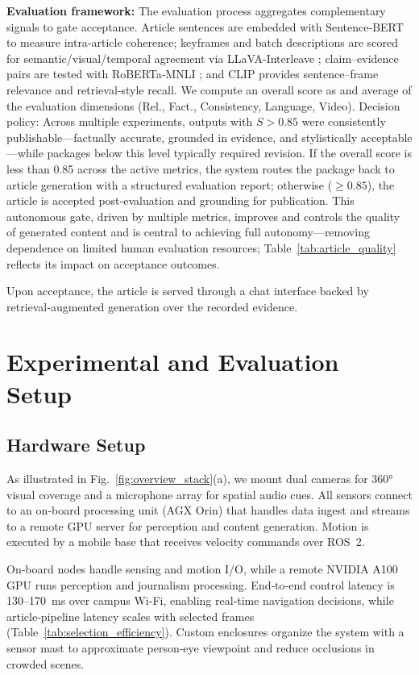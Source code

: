 \documentclass[letterpaper, 10 pt, conference]{ieeeconf}  %
\begin{document}
\noindent\textbf{Evaluation framework:} The evaluation process aggregates complementary signals to gate acceptance. Article sentences are embedded with Sentence‑BERT \cite{reimers2019sentencebert} to measure intra‑article coherence; keyframes and batch descriptions are scored for semantic/visual/temporal agreement via LLaVA-Interleave \cite{li2024llava}; claim–evidence pairs are tested with RoBERTa‑MNLI \cite{liu2019roberta}; and CLIP \cite{radford2021clip} provides sentence–frame relevance and retrieval‑style recall. We compute an overall score as and average of the evaluation dimensions (Rel., Fact., Consistency, Language, Video). Decision policy: Across multiple experiments, outputs with $S>0.85$ were consistently publishable—factually accurate, grounded in evidence, and stylistically acceptable—while packages below this level typically required revision. If the overall score is less than 0.85 across the active metrics, the system routes the package back to article generation with a structured evaluation report; otherwise ($\ge 0.85$), the article is accepted post‑evaluation and grounding for publication. This autonomous gate, driven by multiple metrics, improves and controls the quality of generated content and is central to achieving full autonomy—removing dependence on limited human evaluation resources; Table~\ref{tab:article_quality} reflects its impact on acceptance outcomes.

Upon acceptance, the article is served through a chat interface backed by retrieval‑augmented generation over the recorded evidence.

\section{Experimental and Evaluation Setup}

\subsection{Hardware Setup}
As illustrated in Fig.~\ref{fig:overview_stack}(a), we mount dual cameras for 360° visual coverage and a microphone array for spatial audio cues. All sensors connect to an on‑board processing unit (AGX Orin) that handles data ingest and streams to a remote GPU server for perception and content generation. Motion is executed by a mobile base that receives velocity commands over ROS~2.

On‑board nodes handle sensing and motion I/O, while a remote NVIDIA A100 GPU runs perception and journalism processing. End‑to‑end control latency is 130–170~ms over campus Wi‑Fi, enabling real‑time navigation decisions, while article‑pipeline latency scales with selected frames (Table~\ref{tab:selection_efficiency}). Custom enclosures organize the system with a sensor mast to approximate person‑eye viewpoint and reduce occlusions in crowded scenes.
\end{document}
